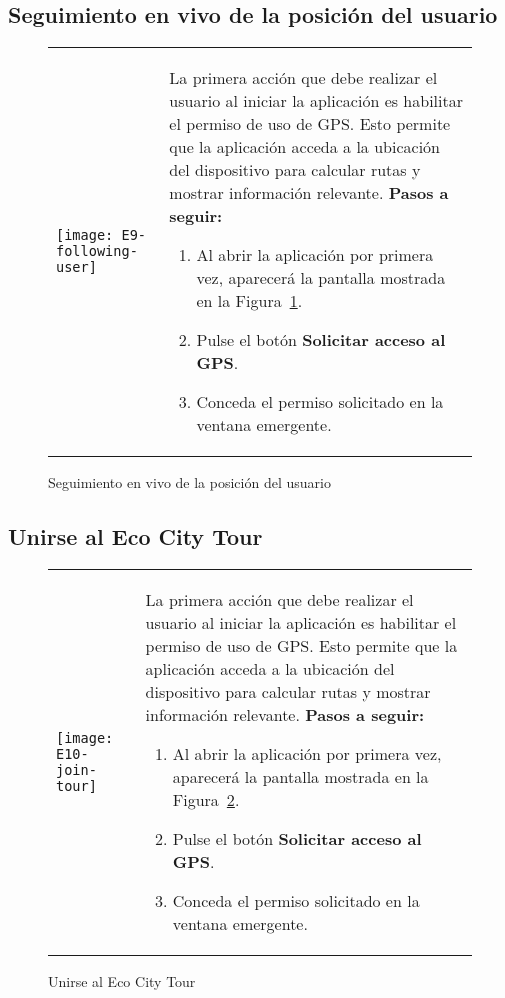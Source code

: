 \subsection{Seguimiento en vivo de la posición del usuario}
\begin{figure}[h!]
	\centering
	\begin{tabular}{m{} m{}}
		\texttt{[image: E9-following-user]} & 
		\vspace{-10pt}
		
		La primera acción que debe realizar el usuario al iniciar la aplicación es habilitar el permiso de uso de GPS. Esto permite que la aplicación acceda a la ubicación del dispositivo para calcular rutas y mostrar información relevante.
		\textbf{Pasos a seguir:}
		\begin{enumerate}
			\item Al abrir la aplicación por primera vez, aparecerá la pantalla mostrada en la Figura~\ref{fig:followingUser}.
			\item Pulse el botón \textbf{Solicitar acceso al GPS}.
			\item Conceda el permiso solicitado en la ventana emergente.
		\end{enumerate}		
	\end{tabular}
	\caption{Seguimiento en vivo de la posición del usuario}
	\label{fig:followingUser}
\end{figure}

\subsection{Unirse al Eco City Tour}
\begin{figure}[h!]
	\centering
	\begin{tabular}{m{} m{}}
		\texttt{[image: E10-join-tour]} & 
		\vspace{-10pt}
		
		La primera acción que debe realizar el usuario al iniciar la aplicación es habilitar el permiso de uso de GPS. Esto permite que la aplicación acceda a la ubicación del dispositivo para calcular rutas y mostrar información relevante.
		\textbf{Pasos a seguir:}
		\begin{enumerate}
			\item Al abrir la aplicación por primera vez, aparecerá la pantalla mostrada en la Figura~\ref{fig:joinECT}.
			\item Pulse el botón \textbf{Solicitar acceso al GPS}.
			\item Conceda el permiso solicitado en la ventana emergente.
		\end{enumerate}		
	\end{tabular}
	\caption{Unirse al Eco City Tour}
	\label{fig:joinECT}
\end{figure}